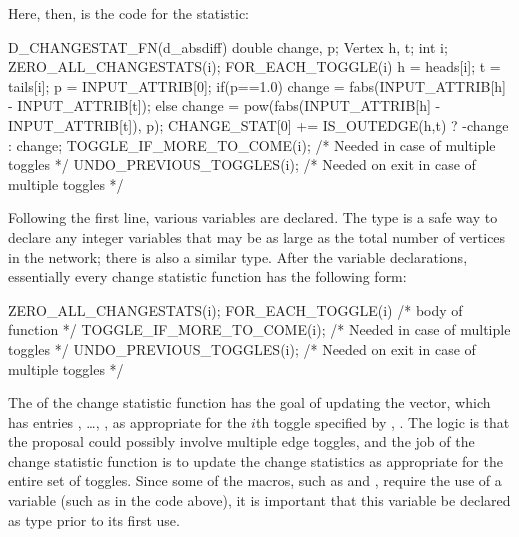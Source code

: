 \documentclass[article]{jss}
\begin{document}
Here, then, is the code for the  statistic:
\begin{CodeChunk}
\begin{CodeInput}
D_CHANGESTAT_FN(d_absdiff) { 
  double change, p; Vertex h, t; int i;
  ZERO_ALL_CHANGESTATS(i);
  FOR_EACH_TOGGLE(i) {
    h = heads[i]; t = tails[i]; 
    p = INPUT_ATTRIB[0];
    if(p==1.0){
      change = fabs(INPUT_ATTRIB[h] - INPUT_ATTRIB[t]);
    }else{
      change = pow(fabs(INPUT_ATTRIB[h] - INPUT_ATTRIB[t]), p);
    }
    CHANGE_STAT[0] += IS_OUTEDGE(h,t) ? -change : change;
    TOGGLE_IF_MORE_TO_COME(i); /* Needed in case of multiple toggles */
  }
  UNDO_PREVIOUS_TOGGLES(i); /* Needed on exit in case of multiple toggles */
}
\end{CodeInput}
\end{CodeChunk}
Following the first line, various variables are declared.  The  type 
is a safe way to declare any integer variables that may be as large as the total number of
vertices in the network; there is also a similar  type.
After the variable declarations, essentially every change statistic function has the following
form:
\begin{CodeChunk}
\begin{CodeInput}
  ZERO_ALL_CHANGESTATS(i);
  FOR_EACH_TOGGLE(i) {
    /* body of function */
    TOGGLE_IF_MORE_TO_COME(i); /* Needed in case of multiple toggles */
  }
  UNDO_PREVIOUS_TOGGLES(i); /* Needed on exit in case of multiple toggles */
\end{CodeInput}
\end{CodeChunk}
The  of the change statistic function has the goal of
updating the  vector, which has entries
, \ldots, 
,
as appropriate for the $i$th toggle specified by 
, .  The logic is that the proposal could possibly involve
multiple edge toggles, and the job of the change statistic function is to update the
change statistics as appropriate for the entire set of toggles.
Since some of the macros, such as  and 
, 
 require the use of a variable (such as  in the code above), it is important
 that this variable be declared as type  prior to its first use.
 
\end{document}
